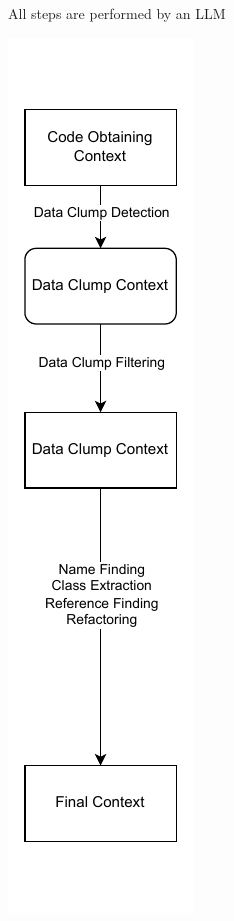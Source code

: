 \begin{figure}[H]
\begin{adjustbox}{minipage=\linewidth,scale=0.7}
\begin{subfigure}[b]{0.3\textwidth}
         \caption{All steps are performed by an \ac{LLM}}
        \label{fig:context_pipeline1}
     \end{subfigure}
     \hfill
     \begin{subfigure}[b]{0.30\textwidth}
         \centering
         \includegraphics[width=\textwidth]{figures/chapter3/context_pipeline_2.drawio.pdf}

\end{subfigure}
\end{adjustbox}
\end{figure}
